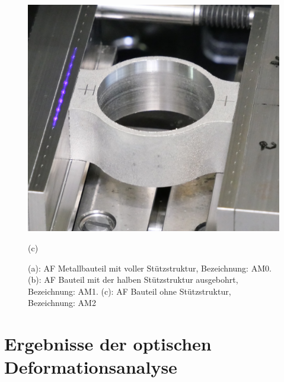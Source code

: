 \begin{figure}[H]
\begin{minipage}{.33\textwidth}
        \centering
        \includegraphics[width=0.9\linewidth]{images/AM2_crop.JPG}
        \caption*{(c)}
      \end{minipage}
      \caption{(a): AF Metallbauteil mit voller Stützstruktur, Bezeichnung: AM0.
      (b): AF Bauteil mit der halben Stützstruktur ausgebohrt, Bezeichnung: AM1.
      (c): AF Bauteil ohne Stützstruktur, Bezeichnung: AM2}
      \label{fig:am_parts}
\end{figure}

\section{Ergebnisse der optischen Deformationsanalyse} \label{defodata}

